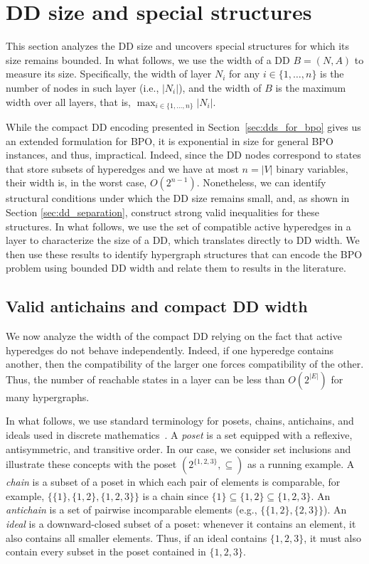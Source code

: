 \section{DD size and special structures}
\label{sec:bdd_size_structures}

This section analyzes the DD size and uncovers special structures for which its size remains bounded. In what follows, we use the width of a DD $B=(N,A)$ to measure its size. Specifically, the width of layer $N_i$ for any $i \in \{1,\ldots,n\}$ is the number of nodes in such layer (i.e., $|N_i|$), and the width of $B$ is the maximum width over all layers, that is,  $\max_{i \in \{1,\ldots,n\}} |N_i|$. 

While the compact DD encoding presented in Section~\ref{sec:dds_for_bpo} gives us an extended formulation for BPO, it is exponential in size for general BPO instances, and thus, impractical. Indeed, since the DD nodes correspond to states that store subsets of hyperedges and we have at most $n = |V|$ binary variables, their width is, in the worst case, $O(2^{n-1})$. Nonetheless, we can identify structural conditions under which the DD size remains small, and, as shown in Section \ref{sec:dd_separation}, construct strong valid inequalities for these structures. In what follows, we use the set of compatible active hyperedges in a layer to characterize the size of a DD, which translates directly to DD width. We then use these results to identify hypergraph structures that can encode the BPO problem using bounded DD width and relate them to results in the literature.


\subsection{Valid antichains and compact DD width}
\label{subsec:states_valid_antichains}

We now analyze the width of the compact DD relying on the fact that active hyperedges do not behave independently. Indeed, if one hyperedge contains another, then the compatibility of the larger one forces compatibility of the other. Thus, the number of reachable states in a layer can be less than $O(2^{|E|})$ for many hypergraphs.

In what follows, we use standard terminology for posets, chains, antichains, and ideals used in discrete mathematics~\cite{stanley2012enumerative}. A \emph{poset} is a set equipped with a reflexive, antisymmetric, and transitive order. In our case, we consider set inclusions and illustrate these concepts with the poset $(2^{\{1,2,3\}}, \subseteq)$ as a running example.  A \emph{chain} is a subset of a poset in which each pair of elements is comparable, for example, $\{\{1\},\{1,2\}, \{1,2,3\}\}$ is a chain since $\{1\}\subseteq \{1,2\}\subseteq \{1,2,3\} $. An \emph{antichain} is a set of pairwise incomparable elements (e.g., $\{\{1,2\},\{2,3\}\}$). An \emph{ideal} is a downward-closed subset of a poset: whenever it contains an element, it also contains all smaller elements. Thus, if an ideal contains $\{1,2,3\}$, it must also contain every subset in the poset contained in $\{1,2,3\}$.

